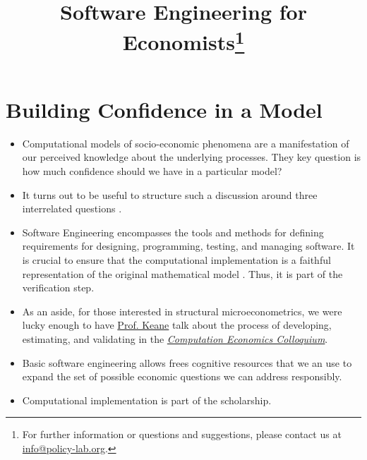 	
\title{Software Engineering for Economists\thanks{For further information or questions and suggestions, please contact us at \href{mailto: info@policy-lab.org}{info@policy-lab.org}.}}
\author{ }\date{ }


\section{Building Confidence in a Model}

\begin{itemize}
\item Computational models of socio-economic phenomena are a manifestation of our perceived knowledge about the underlying processes. They key question is how much confidence should we have in a particular model?
\item  It turns out to be useful to structure such a discussion around three interrelated questions \citet{Council.2012}.
\item  Software Engineering encompasses the tools and methods for defining requirements for designing, programming, testing, and managing software. It is crucial to ensure that the computational implementation is a faithful representation of the original mathematical model \citet{Oberkampf.2010}. Thus, it is part of the verification step.
\item As an aside, for those interested in structural microeconometrics, we were lucky enough to have \href{http://www.economics.ox.ac.uk/Academic/michael-keane}{Prof. Keane} talk about the process of developing, estimating, and validating in the \href{http://bfi.uchicago.edu/events/computational-economics-colloquium}{\textit{Computation Economics Colloquium}}.
\item Basic software engineering allows frees cognitive resources that we an use to expand the set of possible economic questions we can address responsibly.
\item Computational implementation is part of the scholarship.
\end{itemize}
